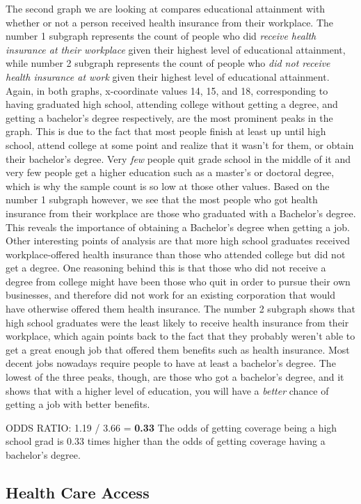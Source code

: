 \documentclass[10pt,]{article}
\begin{document}
The second graph we are looking at compares educational attainment with
whether or not a person received health insurance from their workplace.
The number 1 subgraph represents the count of people who did
\emph{receive health insurance at their workplace} given their highest
level of educational attainment, while number 2 subgraph represents the
count of people who \emph{did not receive health insurance at work}
given their highest level of educational attainment. Again, in both
graphs, x-coordinate values 14, 15, and 18, corresponding to having
graduated high school, attending college without getting a degree, and
getting a bachelor's degree respectively, are the most prominent peaks
in the graph. This is due to the fact that most people finish at least
up until high school, attend college at some point and realize that it
wasn't for them, or obtain their bachelor's degree. Very \emph{few}
people quit grade school in the middle of it and very few people get a
higher education such as a master's or doctoral degree, which is why the
sample count is so low at those other values. Based on the number 1
subgraph however, we see that the most people who got health insurance
from their workplace are those who graduated with a Bachelor's degree.
This reveals the importance of obtaining a Bachelor's degree when
getting a job. Other interesting points of analysis are that more high
school graduates received workplace-offered health insurance than those
who attended college but did not get a degree. One reasoning behind this
is that those who did not receive a degree from college might have been
those who quit in order to pursue their own businesses, and therefore
did not work for an existing corporation that would have otherwise
offered them health insurance. The number 2 subgraph shows that high
school graduates were the least likely to receive health insurance from
their workplace, which again points back to the fact that they probably
weren't able to get a great enough job that offered them benefits such
as health insurance. Most decent jobs nowadays require people to have at
least a bachelor's degree. The lowest of the three peaks, though, are
those who got a bachelor's degree, and it shows that with a higher level
of education, you will have a \emph{better} chance of getting a job with
better benefits.

ODDS RATIO: 1.19 / 3.66 = \textbf{0.33} The odds of getting coverage
being a high school grad is 0.33 times higher than the odds of getting
coverage having a bachelor's degree.

\subsection{\texorpdfstring{\textbf{Health Care
Access}}{Health Care Access}}\label{health-care-access-1}
\end{document}
